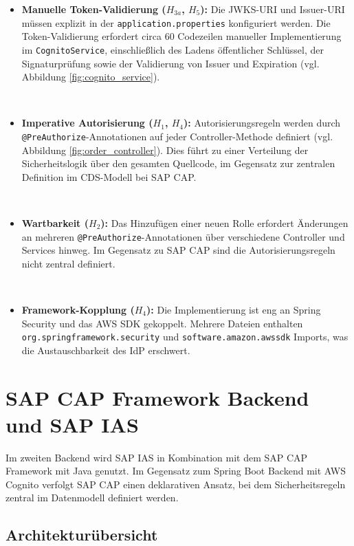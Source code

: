 \begin{itemize}
    \item \textbf{Manuelle Token-Validierung ($H_{3a}$, $H_5$):} Die \ac{JWKS}-\ac{URI} und Issuer-\ac{URI} müssen explizit in der \texttt{application.properties} konfiguriert werden. Die Token-Validierung erfordert circa 60 Codezeilen manueller Implementierung im \texttt{CognitoService}, einschließlich des Ladens öffentlicher Schlüssel, der Signaturprüfung sowie der Validierung von Issuer und Expiration (vgl. Abbildung \ref{fig:cognito_service}).

    \item \textbf{Imperative Autorisierung ($H_1$, $H_4$):} Autorisierungsregeln werden durch \texttt{@PreAuthorize}-Annotationen auf jeder Controller-Methode definiert (vgl. Abbildung \ref{fig:order_controller}). Dies führt zu einer Verteilung der Sicherheitslogik über den gesamten Quellcode, im Gegensatz zur zentralen Definition im \ac{CDS}-Modell bei \ac{SAP CAP}.

    \item \textbf{Wartbarkeit ($H_2$):} Das Hinzufügen einer neuen Rolle erfordert Änderungen an mehreren \texttt{@PreAuthorize}-Annotationen über verschiedene Controller und Services hinweg. Im Gegensatz zu \ac{SAP CAP} sind die Autorisierungsregeln nicht zentral definiert.

    \item \textbf{Framework-Kopplung ($H_4$):} Die Implementierung ist eng an Spring Security und das \ac{AWS} \ac{SDK} gekoppelt. Mehrere Dateien enthalten \texttt{org.springframework.security} und \texttt{software.amazon.awssdk} Imports, was die Austauschbarkeit des \ac{IdP} erschwert.
\end{itemize}

\section{SAP CAP Framework Backend und SAP IAS}
\label{sec:sap_backend}

Im zweiten Backend wird \ac{SAP IAS} in Kombination mit dem \ac{SAP CAP} Framework mit Java genutzt. Im Gegensatz zum Spring Boot Backend mit \ac{AWS} Cognito verfolgt \ac{SAP CAP} einen deklarativen Ansatz, bei dem Sicherheitsregeln zentral im Datenmodell definiert werden.

\subsection{Architekturübersicht}

